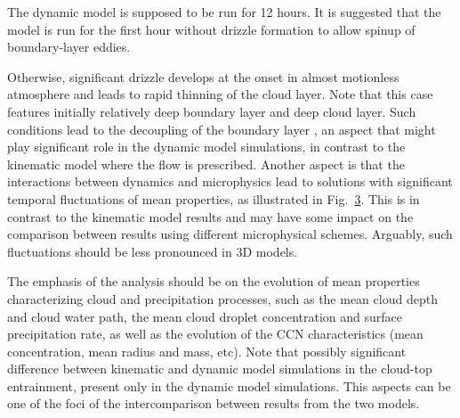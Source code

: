 \documentclass{article}
\begin{document}
  The dynamic model is supposed to be run for 12 hours. 
  It is suggested that the model is run for the first hour without drizzle formation 
    to allow spinup of boundary-layer eddies.

  Otherwise, significant drizzle develops at the onset in almost motionless atmosphere 
    and leads to rapid thinning of the cloud layer. 
  Note that this case features initially relatively deep boundary layer and deep cloud layer. 
  Such conditions lead to the decoupling of the boundary layer \citep[cf.][]{Jones_et_al_2011}, 
    an aspect that might play significant role in the dynamic model simulations, in contrast 
    to the kinematic model where the flow is prescribed. 
  Another aspect is that the interactions between dynamics and microphysics lead to solutions 
    with significant temporal fluctuations of mean properties, as illustrated in Fig.~\ref{fig3}. 
  This is in contrast to the kinematic model results and may have some impact on the comparison 
    between results using different microphysical schemes. 
  Arguably, such fluctuations should be less pronounced in 3D models.

  The emphasis of the analysis should be on the evolution of mean properties characterizing 
    cloud and precipitation processes, such as the mean cloud depth and cloud water path, 
    the mean cloud droplet concentration and surface precipitation rate, as well as the 
    evolution of the CCN characteristics (mean concentration, mean radius and mass, etc). 
  Note that possibly significant difference between kinematic and dynamic model simulations 
    in the cloud-top entrainment, present only in the dynamic model simulations. 
  This aspects can be one of the foci of the intercomparison between results from the two models.

  \begin{figure}
    \caption{\label{fig1}
    }
  \end{figure}

  \begin{figure}
    \caption{\label{fig2}
    }
  \end{figure}
  
  \begin{figure}
    \caption{\label{fig3}
    }
  \end{figure}
  
  \clearpage

  
  
\end{document}
